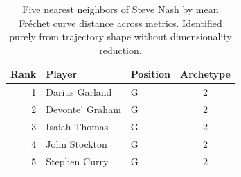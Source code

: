 \begin{table}[htbp]
  \centering\small
  \begin{tabular}{rllc}
    \toprule
    Rank & Player & Position & Archetype \\
    \midrule
    1 & Darius Garland & G & 2 \\
    2 & Devonte' Graham & G & 2 \\
    3 & Isaiah Thomas & G & 2 \\
    4 & John Stockton & G & 2 \\
    5 & Stephen Curry & G & 2 \\
    \bottomrule
  \end{tabular}
  \caption{Five nearest neighbors of Steve Nash by mean Fr\'{e}chet curve distance across metrics. Identified purely from trajectory shape without dimensionality reduction.}
  \label{tab:Steve_Nash_frechet_curve_neighbors}
\end{table}

